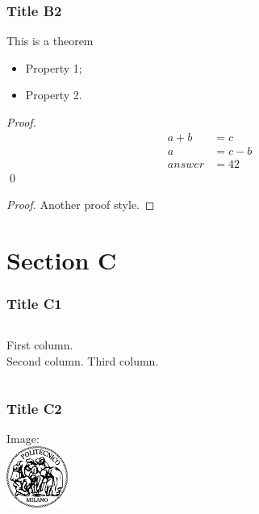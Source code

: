 \documentclass[c]{beamer}
\begin{document}

\begin{frame}
\frametitle{Title B2}

\begin{theorem}[Th. Name]
\label{thlabel} This is a theorem
\begin{itemize}
\item Property 1;
\item Property 2.
\end{itemize}
\end{theorem}

\pause

\textit{Proof. }
\begin{align}
    a + b & = c \\
    a & = c - b \\
    answer & = 42
\end{align}
\qed

\pause

\begin{proof}
Another proof style.
\end{proof}

\end{frame}

\section{Section C}

\begin{frame}
\frametitle{Title C1}

\begin{columns}[t, onlytextwidth]
First column.\\
\pause{}
Second column.
\pause
{}
Third column.
\end{columns}

\end{frame}


\begin{frame}
\frametitle{Title C2}


\centering
Image:\\
\bigskip\bigskip
\includegraphics[height=2cm]{gfx/logo-polimi}

\end{frame}

\end{document}
